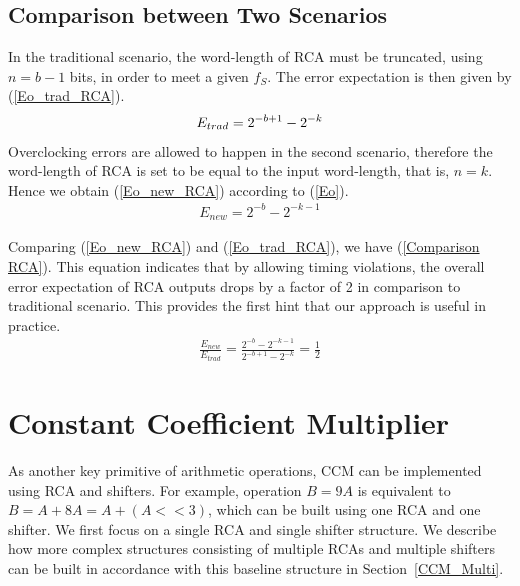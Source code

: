 \documentclass[journal]{IEEEtran}
\begin{document}
\subsection{Comparison between Two Scenarios}
In the traditional scenario, the word-length of RCA must be truncated, using $n=b-1$ bits, in order to meet a given $f_S$. The error expectation is then given by (\ref{Eo_trad_RCA}).
%
\begin{eqnarray}\label{Eo_trad_RCA}
  E_{trad}=2^{-b+1}-2^{-k}
  \vspace{-1ex}
\end{eqnarray}
Overclocking errors are allowed to happen in the second scenario, therefore the word-length of RCA is set to be equal to the input word-length, that is, $n=k$. Hence we obtain (\ref{Eo_new_RCA}) according to (\ref{Eo}).
%
\begin{eqnarray}\label{Eo_new_RCA}
  E_{new}=2^{-b}-2^{-k-1}
\end{eqnarray}

%
Comparing (\ref{Eo_new_RCA}) and (\ref{Eo_trad_RCA}), we have (\ref{Comparison RCA}). This equation indicates that by allowing timing violations, the overall error expectation of RCA outputs drops by a factor of 2 in comparison to traditional scenario. This provides the first hint that our approach is useful in practice.
%
\begin{eqnarray}\label{Comparison RCA}
  \frac{E_{new}}{E_{trad}}=\frac{2^{-b}-2^{-k-1}}{2^{-b+1}-2^{-k}}=\frac{1}{2}
\end{eqnarray}

\section{Constant Coefficient Multiplier}\label{section_CCM}

As another key primitive of arithmetic operations, CCM can be implemented using RCA and shifters. For example, operation $B=9A$ is equivalent to $B=A+8A=A+(A<<3)$, which can be built using one RCA and one shifter. We first focus on a single RCA and single shifter structure. We describe how more complex structures consisting of multiple RCAs and multiple shifters can be built in accordance with this baseline structure in Section~\ref{CCM_Multi}.
\end{document}
